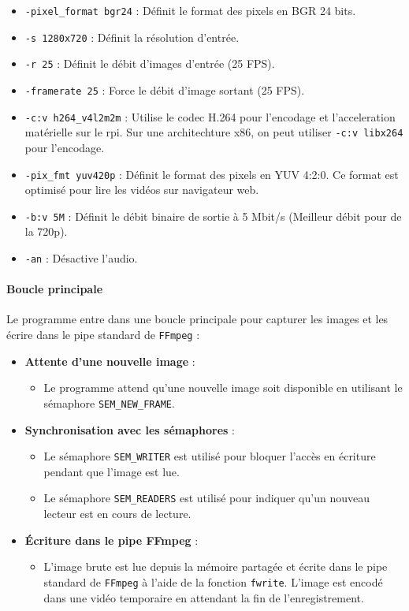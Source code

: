 \documentclass[a4paper, 11pt, french]{article}
\begin{document}
\begin{itemize}
\begin{itemize}
        \item \texttt{-pixel\_format bgr24} : Définit le format des pixels en BGR 24 bits.
        \item \texttt{-s 1280x720} : Définit la résolution d'entrée.
        \item \texttt{-r 25} : Définit le débit d'images d'entrée (25 FPS).
        \item \texttt{-framerate 25} : Force le débit d'image sortant (25 FPS).
        \item \texttt{-c:v h264\_v4l2m2m} : Utilise le codec H.264 pour l'encodage et l'acceleration matérielle sur le rpi. Sur une architechture x86, on peut utiliser \texttt{-c:v libx264} pour l'encodage.
        \item \texttt{-pix\_fmt yuv420p} : Définit le format des pixels en YUV 4:2:0. Ce format est optimisé pour lire les vidéos sur navigateur web.
        \item \texttt{-b:v 5M} : Définit le débit binaire de sortie à 5 Mbit/s (Meilleur débit pour de la 720p).
        \item \texttt{-an} : Désactive l'audio.
    \end{itemize}
\end{itemize}



\paragraph{Boucle principale}
Le programme entre dans une boucle principale pour capturer les images et les écrire dans le pipe standard de \texttt{FFmpeg} :
\begin{itemize}
    \item \textbf{Attente d'une nouvelle image} :
    \begin{itemize}
        \item Le programme attend qu'une nouvelle image soit disponible en utilisant le sémaphore \texttt{SEM\_NEW\_FRAME}.
    \end{itemize}
    \item \textbf{Synchronisation avec les sémaphores} :
    \begin{itemize}
        \item Le sémaphore \texttt{SEM\_WRITER} est utilisé pour bloquer l'accès en écriture pendant que l'image est lue.
        \item Le sémaphore \texttt{SEM\_READERS} est utilisé pour indiquer qu'un nouveau lecteur est en cours de lecture.
    \end{itemize}
    \item \textbf{Écriture dans le pipe FFmpeg} :
    \begin{itemize}
        \item L'image brute est lue depuis la mémoire partagée et écrite dans le pipe standard de \texttt{FFmpeg} à l'aide de la fonction \texttt{fwrite}. L'image est encodé dans une vidéo temporaire en attendant la fin de l'enregistrement.
    \end{itemize}
\end{itemize}
\end{document}
